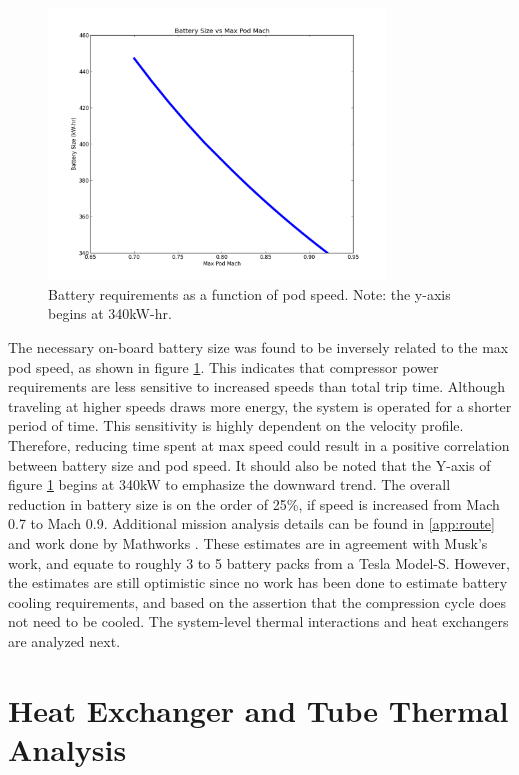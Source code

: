 \documentclass[heading.tex]{subfiles}
\begin{document}
\begin{figure}[hbtp]
\centering
\includegraphics[width=0.8\textwidth]{images/mach_vs_energy.png}
\caption[Battery requirements as a function of pod speed]{Battery requirements as a function of pod speed. Note: the y-axis begins at 340kW-hr.}
\label{f:battery}
\end{figure}

The necessary on-board battery size was found to be inversely related to the max pod speed, as shown in figure \ref{f:battery}.
This indicates that compressor power requirements are less sensitive to increased speeds than total trip time.
Although traveling at higher speeds draws more energy, the system is operated for a shorter period of time.
This sensitivity is highly dependent on the velocity profile.
Therefore, reducing time spent at max speed could result in a positive correlation between battery size and pod speed.
It should also be noted that the Y-axis of figure \ref{f:battery} begins at 340kW to emphasize the downward trend.
The overall reduction in battery size is on the order of 25\%, if speed is increased from Mach 0.7 to Mach 0.9.
Additional mission analysis details can be found in \cref{app:route} and work done by Mathworks \cite{Rouleau}.
These estimates are in agreement with Musk’s work, and equate to roughly 3 to 5 battery packs from a Tesla Model-S.
However, the estimates are still optimistic since no work has been done to estimate battery cooling requirements,
and based on the assertion that the compression cycle does not need to be cooled.
The system-level thermal interactions and heat exchangers are analyzed next.

\section{Heat Exchanger and Tube Thermal Analysis}
\end{document}
